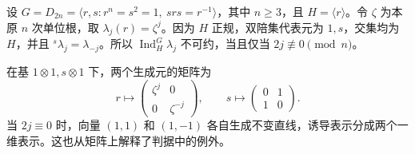 \begin{example}\label{b5:exm:dihedral-induction}
	设 \(G=D_{2n}=\langle r,s:r^n=s^2=1,\ srs=r^{-1}\rangle\)，其中 \(n\geq3\)，且 \(H=\langle r\rangle\)。令 \(\zeta\) 为本原 \(n\) 次单位根，取 \(\lambda_j(r)=\zeta^j\)。因为 \(H\) 正规，双陪集代表元为 \(1,s\)，交集均为 \(H\)，并且 \({}^s\lambda_j=\lambda_{-j}\)。所以 \(\operatorname{Ind}_H^G\lambda_j\) 不可约，当且仅当 \(2j\not\equiv0\pmod n\)。

	\ProseParagraphBreak
	在基 \(1\otimes1,s\otimes1\) 下，两个生成元的矩阵为
	\[
		r\longmapsto
		\begin{pmatrix}\zeta^j&0\\0&\zeta^{-j}\end{pmatrix},
		\qquad s\longmapsto
		\begin{pmatrix}0&1\\1&0\end{pmatrix}.
	\]
	当 \(2j\equiv0\) 时，向量 \((1,1)\) 和 \((1,-1)\) 各自生成不变直线，诱导表示分成两个一维表示。这也从矩阵上解释了判据中的例外。
\end{example}
